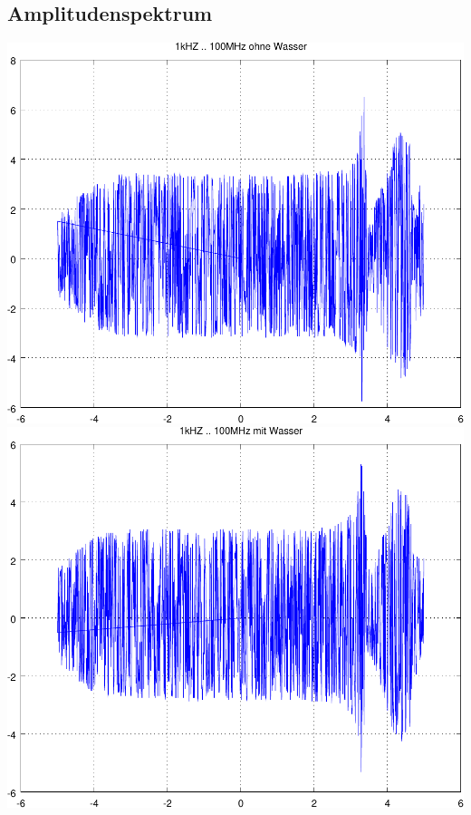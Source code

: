\documentclass[a4,paper,fleqn]{article}
\begin{document}
\subsection{Amplitudenspektrum}
\begin{minipage}{0.45\textwidth}
    \includegraphics[width=1.0\textwidth]{mess01/scope_1.pdf}
    \includegraphics[width=1.0\textwidth]{mess01/scope_0.pdf}
\end{minipage}
\end{document}

